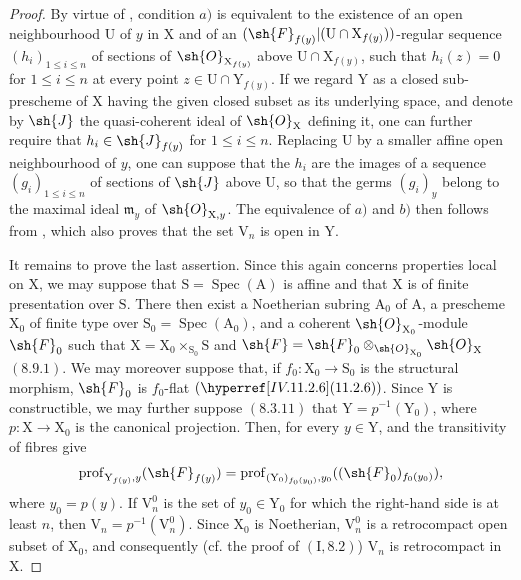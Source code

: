\begin{proof}
By virtue of , condition $a)$ is equivalent to the existence of an open neighbourhood $\mathrm{U}$ of $y$ in $\mathrm{X}$ and of an $(\sh{F}_{f(y)}|(\mathrm{U}\cap\mathrm{X}_{f(y)}))$-regular sequence $(h_i)_{1\leqslant i\leqslant n}$ of sections of $\sh{O}_{\mathrm{X}_{f(y)}}$ above $\mathrm{U}\cap\mathrm{X}_{f(y)}$, such that $h_i(z)=0$ for $1\leqslant i\leqslant n$ at every point $z\in\mathrm{U}\cap\mathrm{Y}_{f(y)}$. If we regard $\mathrm{Y}$ as a closed sub-prescheme of $\mathrm{X}$ having the given closed subset as its underlying space, and denote by $\sh{J}$ the quasi-coherent ideal of $\sh{O}_\mathrm{X}$ defining it, one can further require that $h_i\in\sh{J}_{f(y)}$ for $1\leqslant i\leqslant n$. Replacing $\mathrm{U}$ by a smaller affine open neighbourhood of $y$, one can suppose that the $h_i$ are the images of a sequence $(g_i)_{1\leqslant i\leqslant n}$ of sections of $\sh{J}$ above $\mathrm{U}$, so that the germs $(g_i)_y$ belong to the maximal ideal $\mathfrak{m}_y$ of $\sh{O}_{\mathrm{X},y}$. The equivalence of $a)$ and $b)$ then follows from , which also proves that the set $\mathrm{V}_n$ is open in $\mathrm{Y}$.

It remains to prove the last assertion. Since this again concerns properties local on $\mathrm{X}$, we may suppose that $\mathrm{S}=\operatorname{Spec}(\mathrm{A})$ is affine and that $\mathrm{X}$ is of finite presentation over $\mathrm{S}$. There then exist a Noetherian subring $\mathrm{A}_0$ of $\mathrm{A}$, a prescheme $\mathrm{X}_0$ of finite type over $\mathrm{S}_0=\operatorname{Spec}(\mathrm{A}_0)$, and a coherent $\sh{O}_{\mathrm{X}_0}$-module $\sh{F}_0$ such that $\mathrm{X}=\mathrm{X}_0\times_{\mathrm{S}_0}\mathrm{S}$ and $\sh{F}=\sh{F}_0\otimes_{\sh{O}_{\mathrm{X}_0}}\sh{O}_\mathrm{X}$ $(8.9.1)$. We may moreover suppose that, if $f_0:\mathrm{X}_0\to\mathrm{S}_0$ is the structural morphism, $\sh{F}_0$ is $f_0$-flat $(\sref{IV.11.2.6})$. Since $\mathrm{Y}$ is constructible, we may further suppose $(8.3.11)$ that $\mathrm{Y}=p^{-1}(\mathrm{Y}_0)$, where $p:\mathrm{X}\to\mathrm{X}_0$ is the canonical projection. Then, for every $y\in\mathrm{Y}$,  and the transitivity of fibres give
\[
  \operatorname{prof}_{\mathrm{Y}_{f(y)},y}(\sh{F}_{f(y)})
  =\operatorname{prof}_{(\mathrm{Y}_0)_{f_0(y_0)},y_0}((\sh{F}_0)_{f_0(y_0)}),
\]
where $y_0=p(y)$. If $\mathrm{V}_n^0$ is the set of $y_0\in\mathrm{Y}_0$ for which the right-hand side is at least $n$, then $\mathrm{V}_n=p^{-1}(\mathrm{V}_n^0)$. Since $\mathrm{X}_0$ is Noetherian, $\mathrm{V}_n^0$ is a retrocompact open subset of $\mathrm{X}_0$, and consequently (cf. the proof of $(\mathrm{I},8.2)$) $\mathrm{V}_n$ is retrocompact in $\mathrm{X}$.
\end{proof}

